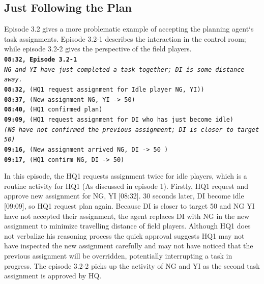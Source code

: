 \subsection{Just Following the Plan}\label{sec:study3planfollow}
Episode 3.2 gives a more problematic example of accepting the planning agent`s task assignments. Episode 3.2-1 describes the interaction in the control room; while episode 3.2-2 gives the perspective of the field players.\\

\noindent\texttt{\textbf{08:32, Episode 3.2-1}\\
\emph{NG and YI have just completed a task together; DI is some distance away.}\\
\textbf{08:32,} (HQ1 request assignment for Idle player NG, YI))\\
\textbf{08:37,} (New assignment NG, YI -> 50) \\
\textbf{08:40,} (HQ1 confirmed plan) \\
\textbf{09:09,} (HQ1 request assignment for DI who has just become idle) \\
\emph{(NG have not confirmed the previous assignment; DI is closer to target 50)}\\
\textbf{09:16,} (New assignment arrived NG, DI -> 50 )\\
\textbf{09:17,} (HQ1 confirm NG, DI -> 50)\\
}



In this episode, the HQ1 requests assignment twice for idle players, which is a routine activity for HQ1 (As discussed in episode 1). Firstly, HQ1 request and approve new assignment for NG, YI [08:32]. 30 seconds later, DI become idle [09:09], so HQ1 request plan again. Because DI is closer to target 50 and NG YI have not accepted their assignment, the agent replaces DI with NG in the new assignment to minimize travelling distance of field players. Although HQ1 does not verbalize his reasoning process the quick approval suggests HQ1 may not have inspected the new assignment carefully and may not have noticed that the previous assignment will be overridden, potentially interrupting a task in progress. The episode 3.2-2 picks up the activity of NG and YI as the second task assignment is approved by HQ.\\

